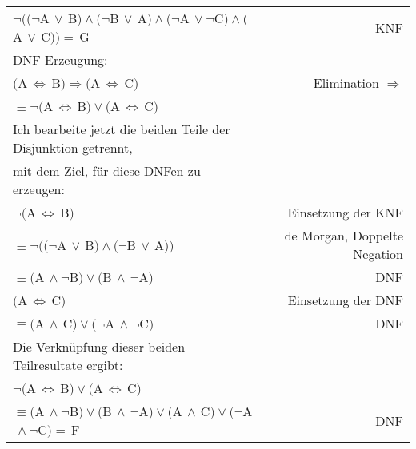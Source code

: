 \documentclass[10pt,a4paper,oneside,ngerman,numbers=noenddot]{scrartcl}
\begin{document}
\begin{tabular}{lr}
$\neg((\neg$A$\, \vee \,$B$) \wedge (\neg$B$\, \vee \,$A$) \wedge (\neg$A$\, \vee \neg$C$) \wedge ($A$\, \vee \,$C$)) = \,$G & KNF \\
DNF-Erzeugung: \\
$($A$\, \Leftrightarrow \,$B$) \Rightarrow ($A$\, \Leftrightarrow \,$C$)$ & Elimination $\Rightarrow$ \\
$\equiv \neg($A$\, \Leftrightarrow \,$B$) \vee ($A$\, \Leftrightarrow \,$C$)$ \\
Ich bearbeite jetzt die beiden Teile der Disjunktion getrennt,\\ 
mit dem Ziel, für diese DNFen zu erzeugen:\\
$\neg($A$\, \Leftrightarrow \,$B$)$ & Einsetzung der KNF \\
$\equiv \neg((\neg$A$\, \vee \,$B$) \wedge (\neg$B$\, \vee \,$A$))$ & de Morgan, Doppelte Negation \\
$\equiv ($A$\, \wedge \neg$B$) \vee ($B$\, \wedge \, \neg$A$)$ & DNF \\
$($A$\, \Leftrightarrow \,$C$)$ & Einsetzung der DNF \\
$\equiv ($A$\, \wedge \,$C$) \vee (\neg$A$\, \wedge \neg$C$)$ & DNF \\
Die Verknüpfung dieser beiden Teilresultate ergibt: \\
$\neg($A$\, \Leftrightarrow \,$B$) \vee ($A$\, \Leftrightarrow \,$C$)$ \\
$\equiv ($A$\, \wedge \neg$B$) \vee ($B$\, \wedge \, \neg$A$) \vee ($A$\, \wedge \,$C$) \vee (\neg$A$\, \wedge \neg$C$) = \,$F & DNF
\end{tabular}
\end{document}
